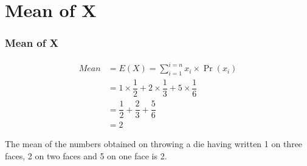 \documentclass{beamer}
\providecommand{\pr}[1]{\ensuremath{\Pr\left(#1\right)}}
\providecommand{\brak}[1]{\ensuremath{\left(#1\right)}}
\begin{document}
\section{Mean of X}
\begin{frame}
\frametitle{Mean of X}

\begin{align}
    Mean &= E\brak{X} = \sum_{i = 1}^{i = n}x_i \times \pr{x_i}\\
    &= 1 \times \dfrac{1}{2} + 2 \times \dfrac{1}{3} + 5 \times \dfrac{1}{6}\\
    &= \dfrac{1}{2} + \dfrac{2}{3} + \dfrac{5}{6}\\
    &= 2
\end{align}
\end{frame}

\begin{frame}
\begin{block}{}
   The mean of the numbers obtained on throwing a die having written 1 on three faces, 2 on two faces and 5 on one face is 2.
\end{block}

\end{frame}
\end{document}
